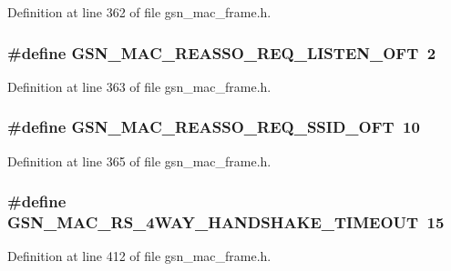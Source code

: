 Definition at line 362 of file gsn\_\-mac\_\-frame.h.

\hypertarget{a00523_a3b00199e48ac3d69c92efe08970e1c27}{
\subsubsection[{GSN\_\-MAC\_\-REASSO\_\-REQ\_\-LISTEN\_\-OFT}]{\setlength{\rightskip}{0pt plus 5cm}\#define GSN\_\-MAC\_\-REASSO\_\-REQ\_\-LISTEN\_\-OFT~2}}
\label{a00523_a3b00199e48ac3d69c92efe08970e1c27}


Definition at line 363 of file gsn\_\-mac\_\-frame.h.

\hypertarget{a00523_aa4b1990ba8e4e70b9c3710760110b78e}{
\subsubsection[{GSN\_\-MAC\_\-REASSO\_\-REQ\_\-SSID\_\-OFT}]{\setlength{\rightskip}{0pt plus 5cm}\#define GSN\_\-MAC\_\-REASSO\_\-REQ\_\-SSID\_\-OFT~10}}
\label{a00523_aa4b1990ba8e4e70b9c3710760110b78e}


Definition at line 365 of file gsn\_\-mac\_\-frame.h.

\hypertarget{a00523_ab943d1d15bd6dd2c5973e17eb58b87ab}{
\subsubsection[{GSN\_\-MAC\_\-RS\_\-4WAY\_\-HANDSHAKE\_\-TIMEOUT}]{\setlength{\rightskip}{0pt plus 5cm}\#define GSN\_\-MAC\_\-RS\_\-4WAY\_\-HANDSHAKE\_\-TIMEOUT~15}}
\label{a00523_ab943d1d15bd6dd2c5973e17eb58b87ab}


Definition at line 412 of file gsn\_\-mac\_\-frame.h.

